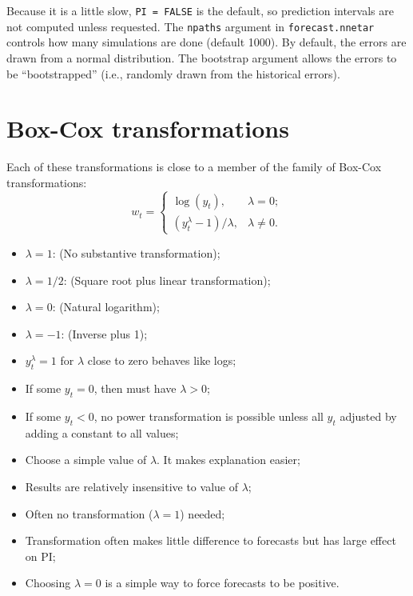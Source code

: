 \documentclass[]{book}
\providecommand{\tightlist}{%
  \setlength{\itemsep}{0pt}\setlength{\parskip}{0pt}}
\begin{document}
Because it is a little slow, \texttt{PI\ =\ FALSE} is the default, so
prediction intervals are not computed unless requested. The
\texttt{npaths} argument in \texttt{forecast.nnetar} controls how many
simulations are done (default 1000). By default, the errors are drawn
from a normal distribution. The bootstrap argument allows the errors to
be ``bootstrapped'' (i.e., randomly drawn from the historical errors).

\section{Box-Cox transformations}\label{box-cox-transformations}

Each of these transformations is close to a member of the family of
Box-Cox transformations: \[
w_t =\left\{\begin{array}{ll}
\log(y_t), & \lambda=0;\\
(y_t^{\lambda}-1)/\lambda, & \lambda \neq 0.
\end{array}
\right.
\]

\begin{itemize}
\tightlist
\item
  \(\lambda= 1\): (No substantive transformation);
\item
  \(\lambda= 1/2\): (Square root plus linear transformation);
\item
  \(\lambda= 0\): (Natural logarithm);
\item
  \(\lambda= -1\): (Inverse plus 1);
\item
  \(y_t^{\lambda}=1\) for \(\lambda\) close to zero behaves like logs;
\item
  If some \(y_t = 0\), then must have \(\lambda > 0\);
\item
  If some \(y_t < 0\), no power transformation is possible unless all
  \(y_t\) adjusted by adding a constant to all values;
\item
  Choose a simple value of \(\lambda\). It makes explanation easier;
\item
  Results are relatively insensitive to value of \(\lambda\);
\item
  Often no transformation (\(\lambda= 1\)) needed;
\item
  Transformation often makes little difference to forecasts but has
  large effect on PI;
\item
  Choosing \(\lambda = 0\) is a simple way to force forecasts to be
  positive.
\end{itemize}
\end{document}
